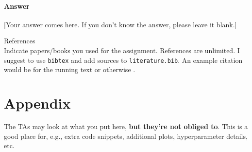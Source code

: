 \documentclass[a4 paper]{article}
\begin{document}
\paragraph{Answer} [Your answer comes here. If you don't know the answer, please leave it blank.]

\newpage
References\\
Indicate papers/books you used for the assignment. References are unlimited. I suggest to use \texttt{bibtex} and add sources to \texttt{literature.bib}. An example citation would be \cite{tomczak2022deep} for the running text or otherwise \citep{tomczak2022deep}.

\renewcommand\bibliographytypesize{\small}



\appendix
\section*{Appendix}

The TAs may look at what you put here, \textbf{but they're not obliged to}. This is a good place for, e.g., extra code snippets, additional plots, hyperparameter details, etc.
\end{document}
